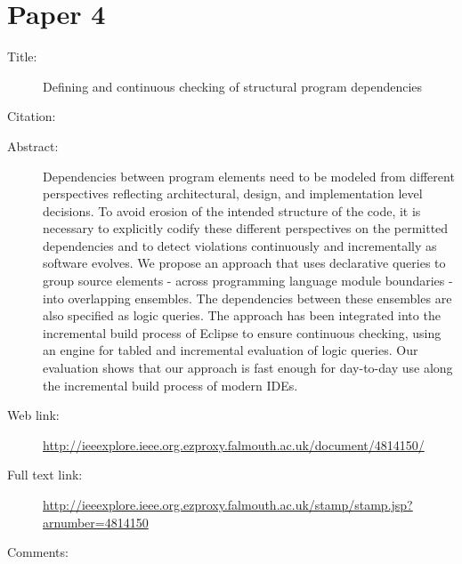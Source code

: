 \documentclass{scrartcl}
\begin{document}
\section*{Paper 4}
\begin{description}
\item[Title:] Defining and continuous checking of structural program dependencies
\item[Citation:] \cite{eichberg2008defining}
\item[Abstract:] Dependencies between program elements need to be modeled from different perspectives reflecting architectural, design, and implementation level decisions. To avoid erosion of the intended structure of the code, it is necessary to explicitly codify these different perspectives on the permitted dependencies and to detect violations continuously and incrementally as software evolves. We propose an approach that uses declarative queries to group source elements - across programming language module boundaries - into overlapping ensembles. The dependencies between these ensembles are also specified as logic queries. The approach has been integrated into the incremental build process of Eclipse to ensure continuous checking, using an engine for tabled and incremental evaluation of logic queries. Our evaluation shows that our approach is fast enough for day-to-day use along the incremental build process of modern IDEs.
\item[Web link:]\url {http://ieeexplore.ieee.org.ezproxy.falmouth.ac.uk/document/4814150/}
\item[Full text link:]\url {http://ieeexplore.ieee.org.ezproxy.falmouth.ac.uk/stamp/stamp.jsp?arnumber=4814150}
\item[Comments:] 
\end{description}
\end{document}
